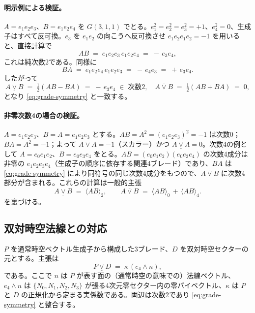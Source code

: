 \documentclass[11pt,a4paper]{article}
\begin{document}
\paragraph{明示例による検証。}
$A=e_{1}e_{2}e_{3}$、$B=e_{1}e_{2}e_{4}$ を $G(3,1,1)$ でとる。$e_{1}^{2}=e_{2}^{2}=e_{3}^{2}=+1$、$e_{4}^{2}=0$、生成子はすべて反可換。$e_{3}$ を $e_{1}e_{2}$ の向こうへ反可換させ $e_{1}e_{2}e_{1}e_{2}=-1$ を用いると、直接計算で
\[
AB \;=\; e_{1}e_{2}e_{3}\,e_{1}e_{2}e_{4} \;=\; -\,e_{3}e_{4},
\]
これは純次数2である。同様に
\[
BA \;=\; e_{1}e_{2}e_{4}\,e_{1}e_{2}e_{3} \;=\; -\,e_{4}e_{3} \;=\; +\,e_{3}e_{4}.
\]
したがって
\[
A\mathbin{\underline{\vee}}B \;=\; \tfrac{1}{2}(AB-BA) \;=\; -\,e_{3}e_{4} \;\in\; \text{次数2},
\quad
A\mathbin{\overline{\vee}}B \;=\; \tfrac{1}{2}(AB+BA) \;=\; 0,
\]
となり \eqref{eq:grade-symmetry} と一致する。

\paragraph{非零次数4の場合の検証。}
$A=e_{1}e_{2}e_{3}$、$B=A=e_{1}e_{2}e_{3}$ とする。$AB=A^{2}=(e_{1}e_{2}e_{3})^{2}=-1$ は次数0；$BA=A^{2}=-1$；よって $A\mathbin{\overline{\vee}}A=-1$（スカラー）かつ $A\mathbin{\underline{\vee}}A=0$。次数4の例として $A=e_{0}e_{1}e_{2}$、$B=e_{0}e_{3}e_{4}$ をとる。$AB=(e_{0}e_{1}e_{2})(e_{0}e_{3}e_{4})$ の次数4成分は非零の $e_{1}e_{2}e_{3}e_{4}$（生成子の順序に依存する関連4ブレード）であり、$BA$ は \eqref{eq:grade-symmetry} により同符号の同じ次数4成分をもつので、$A\mathbin{\overline{\vee}}B$ に次数4部分が含まれる。これらの計算は一般的主張
\[
A \mathbin{\underline{\vee}} B \;=\; \langle AB\rangle_{2},
\qquad
A \mathbin{\overline{\vee}} B \;=\; \langle AB\rangle_{0} \,+\, \langle AB\rangle_{4}.
\]
を裏づける。

\subsection{双対時空法線との対応}

$P$ を通常時空ベクトル生成子から構成した3ブレード、$D$ を双対時空セクターの元とする。主張は
\begin{equation}
P \mathbin{\underline{\vee}} D \;=\; \kappa\,(e_{4}\wedge n),
\label{eq:appB-normal}
\end{equation}
である。ここで $n$ は $P$ が表す面の（通常時空の意味での）法線ベクトル、$e_{4}\wedge n$ は $\{N_{0},N_{1},N_{2},N_{3}\}$ が張る4次元零セクター内の零バイベクトル、$\kappa$ は $P$ と $D$ の正規化から定まる実係数である。両辺は次数2であり \eqref{eq:grade-symmetry} と整合する。
\end{document}
